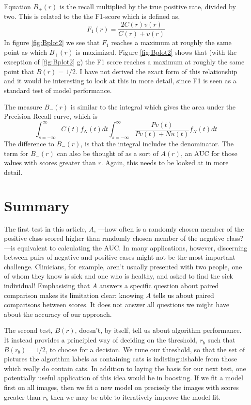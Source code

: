 \documentclass[preprint,12pt]{article}
\begin{document}
Equation $B_+(r)$ is the recall multiplied by the true positive rate, divided by two. This is related to the the F1-score which is defined as,
\begin{equation}
F_1(r) =  \frac{2 C(r) v(r)}{C(r) + v(r)}   \label{eq:F1}
\end{equation}
In figure \ref{fig:Bplot2} we see that $F_1$ reaches a maximum at roughly the same point as which $B_+(r)$ is maximized.  Figure \ref{fig:Bplot2} shows that (with the exception of \ref{fig:Bplot2} g) the F1 score reaches a maximum at roughly the same point that $B(r)=1/2$. I have not derived the exact form of this relationship and it would be interesting to look at this in more detail, since F1 is seen as a standard test of model performance.

The measure $B_-(r)$ is similar to the integral which gives the area under the Precision-Recall curve, which is
\[
\int_{s=-\infty}^{\infty}  C(t) f_N(t) dt  \int_{s=-\infty}^{\infty}  \frac{P v(t)}{P v(t) + N u(t)} f_N(t) dt 
\]
The difference to $B_-(r)$, is that the integral includes the denominator. The term for $B_-(r)$ can also be thought of as a sort of $A(r)$, an AUC for those values with scores greater than $r$. Again, this needs to be looked at in more detail. 

\section{Summary}

The first test in this article, $A$, ---how often is a randomly chosen member of the positive class scored higher than randomly chosen member of the negative class?---is equivalent to calculating the AUC. In many applications, however, discerning between pairs of negative and positive cases might not be the most important challenge. Clinicians, for example, aren't usually presented with two people, one of whom they know is sick and one who is healthy, and asked to find the sick individual! Emphasising that $A$ answers a specific question about paired comparison makes its limitation clear: knowing $A$ tells us about paired comparisons between scores. It does not answer all questions we might have about the accuracy of our approach.

The second test, $B(r)$, doesn't, by itself, tell us about algorithm performance. It instead provides a principled way of deciding on the threshold, $r_b$ such that $B(r_b)=1/2$, to choose for a decision. We tune our threshold, so that the set of pictures the algorithm labels as containing cats is indistinguishable from those which really do contain cats. In addition to laying the basis for our next test, one potentially useful application of this idea would be in boosting. If we fit a model first on all images, then we fit a new model on precisely the images with scores greater than $r_b$ then we may be able to iteratively improve the model fit.
\end{document}
